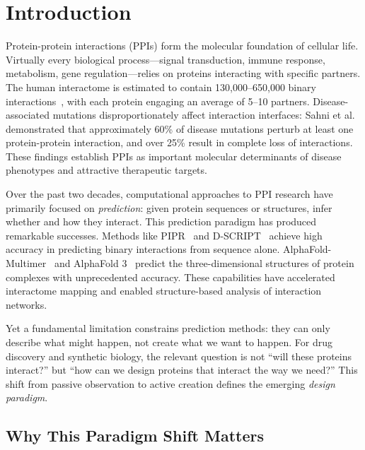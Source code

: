 
\section{Introduction}
\label{sec:introduction}

Protein-protein interactions (PPIs) form the molecular foundation of cellular life. Virtually every biological process---signal transduction, immune response, metabolism, gene regulation---relies on proteins interacting with specific partners. The human interactome is estimated to contain 130,000--650,000 binary interactions~\cite{szklarczyk2021string}, with each protein engaging an average of 5--10 partners. Disease-associated mutations disproportionately affect interaction interfaces: Sahni et al.~\cite{sahni2015edgotype} demonstrated that approximately 60\% of disease mutations perturb at least one protein-protein interaction, and over 25\% result in complete loss of interactions. These findings establish PPIs as important molecular determinants of disease phenotypes and attractive therapeutic targets.

Over the past two decades, computational approaches to PPI research have primarily focused on \textit{prediction}: given protein sequences or structures, infer whether and how they interact. This prediction paradigm has produced remarkable successes. Methods like PIPR~\cite{chen2019pipr} and D-SCRIPT~\cite{sledzieski2021dscript} achieve high accuracy in predicting binary interactions from sequence alone. AlphaFold-Multimer~\cite{evans2022alphafoldmultimer} and AlphaFold 3~\cite{abramson2024alphafold3} predict the three-dimensional structures of protein complexes with unprecedented accuracy. These capabilities have accelerated interactome mapping and enabled structure-based analysis of interaction networks.

Yet a fundamental limitation constrains prediction methods: they can only describe what might happen, not create what we want to happen. For drug discovery and synthetic biology, the relevant question is not ``will these proteins interact?'' but ``how can we design proteins that interact the way we need?'' This shift from passive observation to active creation defines the emerging \textit{design paradigm}.

\subsection*{Why This Paradigm Shift Matters}

